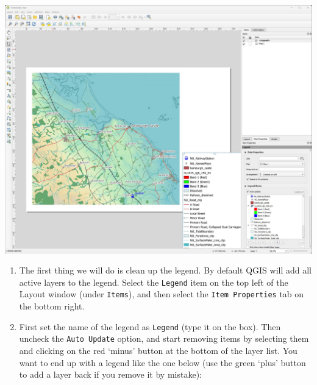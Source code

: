 \documentclass[
  letterpaper,
  DIV=11,
  numbers=noendperiod]{scrreprt}
\begin{document}
\includegraphics{images/lab_8/lab8_fig9_ugly_legend.jpg}

\begin{enumerate}
\def\labelenumi{(\arabic{enumi})}
\setcounter{enumi}{240}
\item
  The first thing we will do is clean up the legend. By default QGIS
  will add all active layers to the legend. Select the \texttt{Legend}
  item on the top left of the Layout window (under \texttt{Items}), and
  then select the \texttt{Item\ Properties} tab on the bottom right.
\item
  First set the name of the legend as \texttt{Legend} (type it on the
  box). Then uncheck the \texttt{Auto\ Update} option, and start
  removing items by selecting them and clicking on the red `minus'
  button at the bottom of the layer list. You want to end up with a
  legend like the one below (use the green `plus' button to add a layer
  back if you remove it by mistake):
\end{enumerate}
\end{document}

